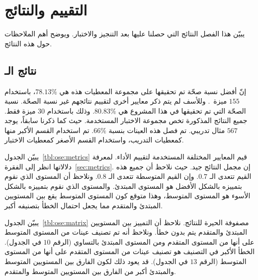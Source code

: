 

\chapter{التقييم والنتائج}
يبيّن هذا الفصل النتائج التي حصلنا عليها بعد التنجيز والاختبار.
ويوضح أهم الملاحظات حول هذه النتائج.

\section{نتائج الـ }
إنّ أفضل نسبة صحّة تم تحقيقها على مجموعة المعطيات هذه هي $78.13\%$،
باستخدام $155$ ميزة~\cite{vajjala2018}.
وللأسف لم يتم ذكر معايير أخرى لتقييم نتائجهم غير نسبة الصحّة.
نسبة الصحّة التي تم تحقيقها في هذا المشروع هي $80.83\%$.
وذلك باستخدام $30$ ميزة فقط.
جميع النتائج المذكورة تخص مجموعة الاختبار المستخدمة.
حيث كما ذكرنا سابقاً، يوجد $567$ مثال تدريبي.
تم فصل هذه العينات بنسبة $66\%$.
تم استخدام القسم الأكبر منها كمعطيات التدريب،
واستخدام القسم الأصغر كمعطيات الاختبار.

يبيّن الجدول~\ref{tbl:ose:metrics} قيم المعايير المختلفة المستخدمة لتقييم الأداء.
لمعرفة دلالاتها انظر إلى الفقرة~\ref{sec:metrics}.
إن مجمل النتائج جيد.
حيث نلاحظ أن جميع هذه القيم تتعدى الـ $0.7$.
وإن القيم المتوسطة تتعدى الـ $0.8$.
ونلاحظ أن المستوى الذي نقوم بتمييزه بالشكل الأفضل هو المستوى المبتدئ.
والمستوى الذي نقوم بتمييزه بالشكل الأسوء هو المستوى المتوسط،
وهذا متوقع كون المستوى المتوسط يقع بين المستويين المبتدئ والمتقدم مما يجعل احتمال الخطأ بتصنيفه أكبر.

يبيّن الجدول~\ref{tbl:ose:matrix} مصفوفة الحيرة للنتائج.
نلاحظ أن التمييز بين المستويين المبتدئ والمتقدم يتم بدون خطأ.
ونلاحظ أنه تم تصنيف عينات من المستوى المتوسط على أنها من المستوى المتقدم ومن المستوى المبتدئ بالتساوي (الرقم $10$ في الجدول).
الخطأ الأكبر في التصنيف هو تصنيف عينات من المستوى المتقدم على أنها من المستوى المتوسط (الرقم $13$ في الجدول).
قد يعود ذلك لكون الفارق بين المستويين المتوسط والمبتدئ أكبر من الفارق بين المستويين المتوسط والمتقدم.

